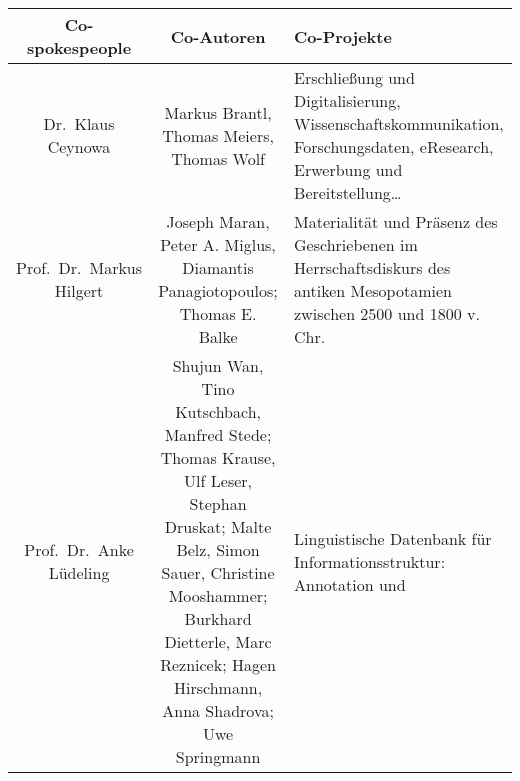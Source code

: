 \documentclass[
]{article}
\begin{document}
\begin{longtable}[]{@{}ccl@{}}
\toprule
\begin{minipage}[b]{0.18\columnwidth}\centering
Co-spokespeople\strut
\end{minipage} & \begin{minipage}[b]{0.37\columnwidth}\centering
Co-Autoren\strut
\end{minipage} & \begin{minipage}[b]{0.37\columnwidth}\raggedright
Co-Projekte\strut
\end{minipage}\tabularnewline
\midrule
\endhead
\begin{minipage}[t]{0.18\columnwidth}\centering
Dr.~Klaus Ceynowa\strut
\end{minipage} & \begin{minipage}[t]{0.37\columnwidth}\centering
Markus Brantl, Thomas Meiers, Thomas Wolf\strut
\end{minipage} & \begin{minipage}[t]{0.37\columnwidth}\raggedright
Erschließung und Digitalisierung, Wissenschaftskommunikation,
Forschungsdaten, eResearch, Erwerbung und Bereitstellung\ldots{}\strut
\end{minipage}\tabularnewline
\begin{minipage}[t]{0.18\columnwidth}\centering
Prof.~Dr.~Markus Hilgert\strut
\end{minipage} & \begin{minipage}[t]{0.37\columnwidth}\centering
Joseph Maran, Peter A. Miglus, Diamantis Panagiotopoulos; Thomas E.
Balke\strut
\end{minipage} & \begin{minipage}[t]{0.37\columnwidth}\raggedright
Materialität und Präsenz des Geschriebenen im Herrschaftsdiskurs des
antiken Mesopotamien zwischen 2500 und 1800 v. Chr.\strut
\end{minipage}\tabularnewline
\begin{minipage}[t]{0.18\columnwidth}\centering
Prof.~Dr.~Anke Lüdeling\strut
\end{minipage} & \begin{minipage}[t]{0.37\columnwidth}\centering
Shujun Wan, Tino Kutschbach, Manfred Stede; Thomas Krause, Ulf Leser,
Stephan Druskat; Malte Belz, Simon Sauer, Christine Mooshammer; Burkhard
Dietterle, Marc Reznicek; Hagen Hirschmann, Anna Shadrova; Uwe
Springmann\strut
\end{minipage} & \begin{minipage}[t]{0.37\columnwidth}\raggedright
Linguistische Datenbank für Informationsstruktur: Annotation und

\end{minipage}
\end{longtable}
\end{document}

